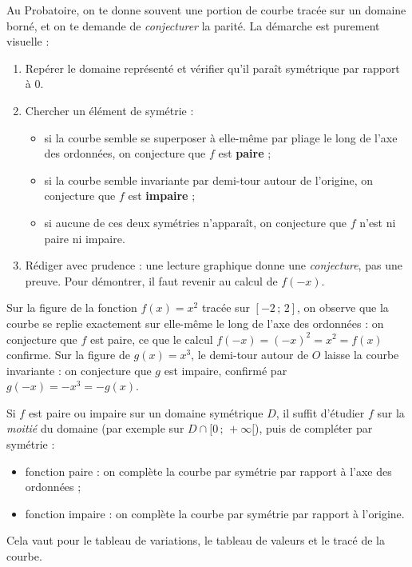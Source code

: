\documentclass[11pt]{article}
\newcommand{\cle}[1]{{\popxbold\color{popdark}#1}}
\newcounter{popsec}
\newcounter{popsub}
\newcommand{\courssub}[1]{%
  \stepcounter{popsub}%
  \par\vspace{9pt}\noindent{\popxbold\fontsize{11.5}{13}\selectfont\color{popink}{\color{poporange}\thepopsec.\thepopsub}\hspace{6pt}#1}\par\nopagebreak\vspace{4pt}
}
\begin{document}
Au Probatoire, on te donne souvent une portion de courbe tracée sur un domaine borné, et on te demande de \emph{conjecturer} la parité. La démarche est purement visuelle :

\begin{methode}
\begin{enumerate}
\item Repérer le domaine représenté et vérifier qu'il paraît symétrique par rapport à $0$.
\item Chercher un \cle{élément de symétrie} :
\begin{itemize}
\item si la courbe semble se superposer à elle-même par pliage le long de l'axe des ordonnées, on conjecture que $f$ est \textbf{paire} ;
\item si la courbe semble invariante par demi-tour autour de l'origine, on conjecture que $f$ est \textbf{impaire} ;
\item si aucune de ces deux symétries n'apparaît, on conjecture que $f$ n'est ni paire ni impaire.
\end{itemize}
\item Rédiger avec prudence : une lecture graphique donne une \emph{conjecture}, pas une preuve. Pour démontrer, il faut revenir au calcul de $f(-x)$.
\end{enumerate}
\end{methode}

\begin{exemplebox}
Sur la figure de la fonction $f(x) = x^2$ tracée sur $[-2\,;\,2]$, on observe que la courbe se replie exactement sur elle-même le long de l'axe des ordonnées : on conjecture que $f$ est paire, ce que le calcul $f(-x) = (-x)^2 = x^2 = f(x)$ confirme. Sur la figure de $g(x) = x^3$, le demi-tour autour de $O$ laisse la courbe invariante : on conjecture que $g$ est impaire, confirmé par $g(-x) = -x^3 = -g(x)$.
\end{exemplebox}

\courssub{Intérêt pratique de la parité}

\begin{aretenir}
Si $f$ est paire ou impaire sur un domaine symétrique $D$, il suffit d'étudier $f$ sur la \emph{moitié} du domaine (par exemple sur $D \cap [0\,;\,+\infty[$), puis de compléter par symétrie :
\begin{itemize}
\item fonction \cle{paire} : on complète la courbe par symétrie par rapport à l'axe des ordonnées ;
\item fonction \cle{impaire} : on complète la courbe par symétrie par rapport à l'origine.
\end{itemize}
Cela vaut pour le tableau de variations, le tableau de valeurs et le tracé de la courbe.
\end{aretenir}
\end{document}
